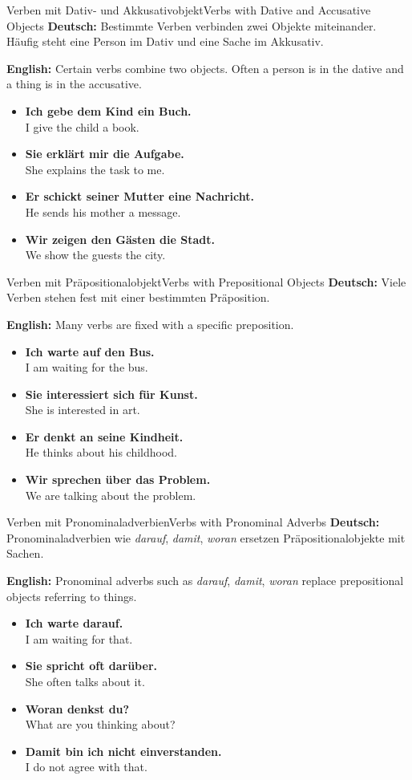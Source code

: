 \documentclass[a4paper,11pt]{article}
\newcommand{\GermanText}[1]{\textbf{Deutsch: }#1\par}
\newcommand{\EnglishText}[1]{{\color{SoftGray}\textbf{English: }#1\par}}
\newcommand{\ExampleItem}[2]{\item \textbf{#1}\\{\color{SoftGray}#2}}
\begin{document}
\begin{grammarentry}{Verben mit Dativ- und Akkusativobjekt}{Verbs with Dative and Accusative Objects}
    \GermanText{Bestimmte Verben verbinden zwei Objekte miteinander. Häufig steht eine Person im Dativ und eine Sache im Akkusativ.}
    \EnglishText{Certain verbs combine two objects. Often a person is in the dative and a thing is in the accusative.}
    \begin{exbox}
        \begin{itemize}
            \ExampleItem{Ich gebe dem Kind ein Buch.}{I give the child a book.}
            \ExampleItem{Sie erklärt mir die Aufgabe.}{She explains the task to me.}
            \ExampleItem{Er schickt seiner Mutter eine Nachricht.}{He sends his mother a message.}
            \ExampleItem{Wir zeigen den Gästen die Stadt.}{We show the guests the city.}
        \end{itemize}
    \end{exbox}
\end{grammarentry}

\begin{grammarentry}{Verben mit Präpositionalobjekt}{Verbs with Prepositional Objects}
    \GermanText{Viele Verben stehen fest mit einer bestimmten Präposition.}
    \EnglishText{Many verbs are fixed with a specific preposition.}
    \begin{exbox}
        \begin{itemize}
            \ExampleItem{Ich warte auf den Bus.}{I am waiting for the bus.}
            \ExampleItem{Sie interessiert sich für Kunst.}{She is interested in art.}
            \ExampleItem{Er denkt an seine Kindheit.}{He thinks about his childhood.}
            \ExampleItem{Wir sprechen über das Problem.}{We are talking about the problem.}
        \end{itemize}
    \end{exbox}
\end{grammarentry}

\begin{grammarentry}{Verben mit Pronominaladverbien}{Verbs with Pronominal Adverbs}
    \GermanText{Pronominaladverbien wie \textit{darauf}, \textit{damit}, \textit{woran} ersetzen Präpositionalobjekte mit Sachen.}
    \EnglishText{Pronominal adverbs such as \textit{darauf}, \textit{damit}, \textit{woran} replace prepositional objects referring to things.}
    \begin{exbox}
        \begin{itemize}
            \ExampleItem{Ich warte darauf.}{I am waiting for that.}
            \ExampleItem{Sie spricht oft darüber.}{She often talks about it.}
            \ExampleItem{Woran denkst du?}{What are you thinking about?}
            \ExampleItem{Damit bin ich nicht einverstanden.}{I do not agree with that.}
        \end{itemize}
    \end{exbox}
\end{grammarentry}
\end{document}
